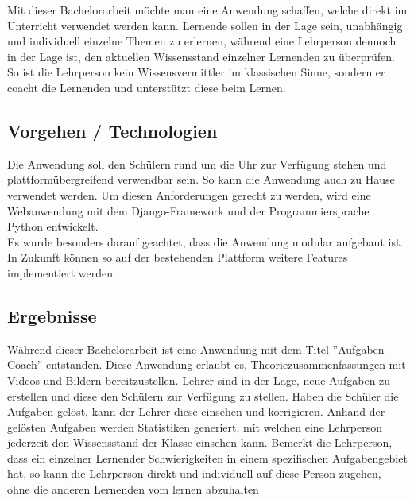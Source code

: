 Mit dieser Bachelorarbeit möchte man eine Anwendung schaffen, welche direkt im Unterricht verwendet werden kann. Lernende sollen in der Lage sein, unabhängig und individuell einzelne Themen zu erlernen, während eine Lehrperson dennoch in der Lage ist, den aktuellen Wissensstand einzelner Lernenden zu überprüfen. So ist die Lehrperson kein Wissensvermittler im klassischen Sinne, sondern er coacht die Lernenden und unterstützt diese beim Lernen.



\subsection{Vorgehen / Technologien}
Die Anwendung soll den Schülern rund um die Uhr zur Verfügung stehen und plattformübergreifend verwendbar sein. So kann die Anwendung auch zu Hause verwendet werden. Um diesen Anforderungen gerecht zu werden, wird eine Webanwendung mit dem Django-Framework und der Programmiersprache Python entwickelt. \\
Es wurde besonders darauf geachtet, dass die Anwendung modular aufgebaut ist. In Zukunft können so auf der bestehenden Plattform weitere Features implementiert werden.

\subsection{Ergebnisse}
Während dieser Bachelorarbeit ist eine Anwendung mit dem Titel ''Aufgaben-Coach'' entstanden. Diese Anwendung erlaubt es, Theoriezusammenfassungen mit Videos und Bildern bereitzustellen. Lehrer sind in der Lage, neue Aufgaben zu erstellen und diese den Schülern zur Verfügung zu stellen. Haben die Schüler die Aufgaben gelöst, kann der Lehrer diese einsehen und korrigieren. Anhand der gelösten Aufgaben werden Statistiken generiert, mit welchen eine Lehrperson jederzeit den Wissensstand der Klasse einsehen kann. Bemerkt die Lehrperson, dass ein einzelner Lernender Schwierigkeiten in einem spezifischen Aufgabengebiet hat, so kann die Lehrperson direkt und individuell auf diese Person zugehen, ohne die anderen Lernenden vom lernen abzuhalten

